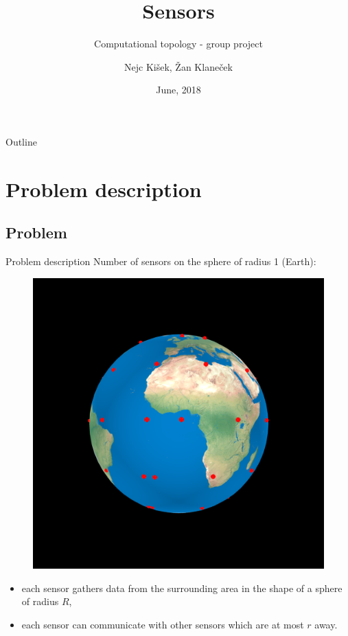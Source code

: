 \documentclass{beamer}
\title{Sensors}
\subtitle{Computational topology - group project}
\author[]{Nejc Kišek, Žan Klaneček}
\institute[] %
{

  Faculty of computer and information science\\
  University of Ljubljana}
\date{June, 2018}
\begin{document}
\begin{frame}
  \titlepage
\end{frame}

\begin{frame}{Outline}
  \tableofcontents
\end{frame}

\section{Problem description}
\subsection{Problem}

\begin{frame}{Problem description}{}
Number of sensors on the sphere of radius 1 (Earth):
\begin{figure}[!ht]
	
	\includegraphics[scale=0.1]{used_images/sensors01}
\end{figure}
\begin{itemize}
	\item {
		each sensor gathers data from the surrounding area in the shape of a sphere of radius
		$R$,
	}
	\item {
		each sensor can communicate with other sensors which are at most $r$ away.
	}
\end{itemize}


\end{frame}
\end{document}
